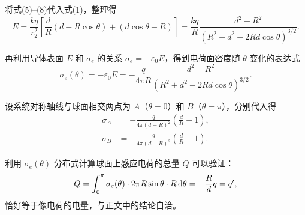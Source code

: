 \begin{solution}[接地导体球的表面电荷分布]
    将式(5)--(8)代入式(1)，整理得
    \[
        E = \frac{kq}{r_2^2} \left[ \frac{d}{R}(d - R\cos\theta) + (d\cos\theta - R) \right] = \frac{kq}{R} \frac{d^2 - R^2}{(R^2 + d^2 - 2Rd \cos\theta)^{3/2}}.
    \]

    再利用导体表面 $E$ 和 $\sigma_e$ 的关系 $\sigma_e = -\varepsilon_0 E$，得到电荷面密度随 $\theta$ 变化的表达式
    \[
        \sigma_e(\theta) = -\varepsilon_0 E = -\frac{q}{4\pi R} \frac{d^2 - R^2}{(R^2 + d^2 - 2Rd \cos\theta)^{3/2}}.
    \]

    设系统对称轴线与球面相交两点为 $A$（$\theta = 0$）和 $B$（$\theta = \pi$），分别代入得
    \[
        \begin{aligned}
            \sigma_A & = -\frac{q}{4\pi(d-R)^2} \left( \frac{d}{R} + 1 \right), \\
            \sigma_B & = -\frac{q}{4\pi(d+R)^2} \left( \frac{d}{R} - 1 \right).
        \end{aligned}
    \]

    利用 $\sigma_e(\theta)$ 分布式计算球面上感应电荷的总量 $Q$ 可以验证：
    \[
        Q = \int_0^{\pi} \sigma_e(\theta) \cdot 2\pi R \sin\theta \cdot R \dif\theta = -\frac{R}{d}q = q',
    \]
    恰好等于像电荷的电量，与正文中的结论自洽。
\end{solution}

